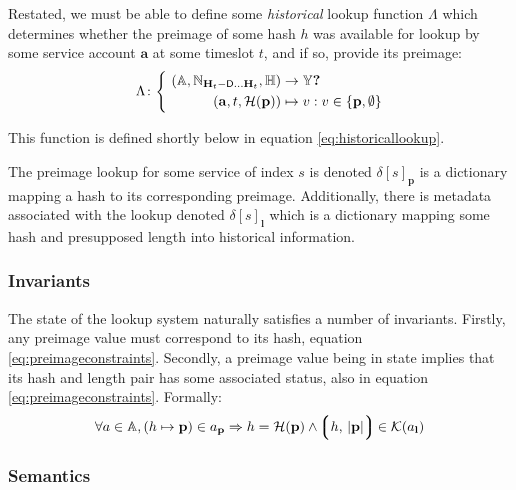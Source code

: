 Restated, we must be able to define some \emph{historical} lookup function $\Lambda$ which determines whether the preimage of some hash $h$ was available for lookup by some service account $\mathbf{a}$ at some timeslot $t$, and if so, provide its preimage:
\begin{equation}
\begin{aligned}
  \Lambda\colon \left\{\ \begin{aligned}
    (\mathbb{A}, \N_{\mathbf{H}_t - \mathsf{D}\dots\mathbf{H}_t}, \mathbb{H}) &\to \mathbb{Y}\bm{?} \\
    (\mathbf{a}, t, \mathcal{H}(\mathbf{p})) &\mapsto v : v \in \{ \mathbf{p}, \none \}
  \end{aligned}\right.
\end{aligned}
\end{equation}

This function is defined shortly below in equation \ref{eq:historicallookup}.

The preimage lookup for some service of index $s$ is denoted $\delta[s]_\mathbf{p}$ is a dictionary mapping a hash to its corresponding preimage. Additionally, there is metadata associated with the lookup denoted $\delta[s]_\mathbf{l}$ which is a dictionary mapping some hash and presupposed length into historical information.

\subsubsection{Invariants}

The state of the lookup system naturally satisfies a number of invariants. Firstly, any preimage value must correspond to its hash, equation \ref{eq:preimageconstraints}. Secondly, a preimage value being in state implies that its hash and length pair has some associated status, also in equation \ref{eq:preimageconstraints}. Formally:
\begin{equation}\label{eq:preimageconstraints}
  \forall a \in \mathbb{A}, (h \mapsto \mathbf{p}) \in a_\mathbf{p} \Rightarrow
    h = \mathcal{H}(\mathbf{p})\wedge
    \tup{h \ts |\mathbf{p}|} \in \keys{a_\mathbf{l}}
\end{equation}

\subsubsection{Semantics}

